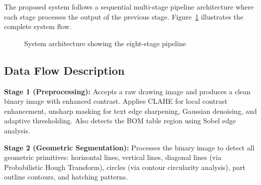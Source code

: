 \documentclass[12pt,a4paper]{article}
\begin{document}
The proposed system follows a sequential multi-stage pipeline architecture where each stage processes the output of the previous stage. Figure~\ref{fig:architecture} illustrates the complete system flow.

\begin{figure}[H]
\centering
{}
\caption{System architecture showing the eight-stage pipeline}
\label{fig:architecture}
\end{figure}

\subsection{Data Flow Description}

\textbf{Stage 1 (Preprocessing):} Accepts a raw drawing image and produces a clean binary image with enhanced contrast. Applies CLAHE for local contrast enhancement, unsharp masking for text edge sharpening, Gaussian denoising, and adaptive thresholding. Also detects the BOM table region using Sobel edge analysis.

\textbf{Stage 2 (Geometric Segmentation):} Processes the binary image to detect all geometric primitives: horizontal lines, vertical lines, diagonal lines (via Probabilistic Hough Transform), circles (via contour circularity analysis), part outline contours, and hatching patterns.
\end{document}
